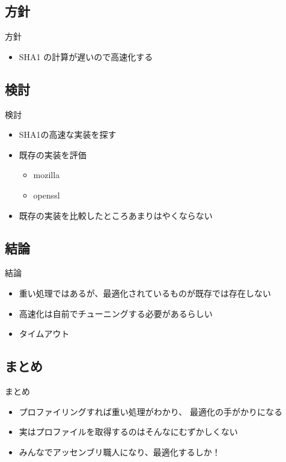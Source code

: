 \documentclass[cjk,dvipdfmx]{beamer}
\begin{document}
\subsection{方針}
\begin{frame}{方針}
 \begin{itemize}
  \item SHA1 の計算が遅いので高速化する
 \end{itemize}
\end{frame}

\subsection{検討}
\begin{frame}{検討}
 \begin{itemize}
  \item SHA1の高速な実装を探す
  \item 既存の実装を評価
	\begin{itemize}
	 \item mozilla
	 \item openssl
	\end{itemize}
  \item 既存の実装を比較したところあまりはやくならない
 \end{itemize}
\end{frame}

\subsection{結論}
\begin{frame}{結論}
 \begin{itemize}
  \item 重い処理ではあるが、最適化されているものが既存では存在しない
  \item 高速化は自前でチューニングする必要があるらしい
  \item タイムアウト
\end{itemize}
\end{frame}

\subsection{まとめ}
\begin{frame}{まとめ}
\begin{itemize}
 \item プロファイリングすれば重い処理がわかり、
       最適化の手がかりになる
 \item 実はプロファイルを取得するのはそんなにむずかしくない
 \item みんなでアッセンブリ職人になり、最適化するしか！
\end{itemize}
\end{frame}
\end{document}
